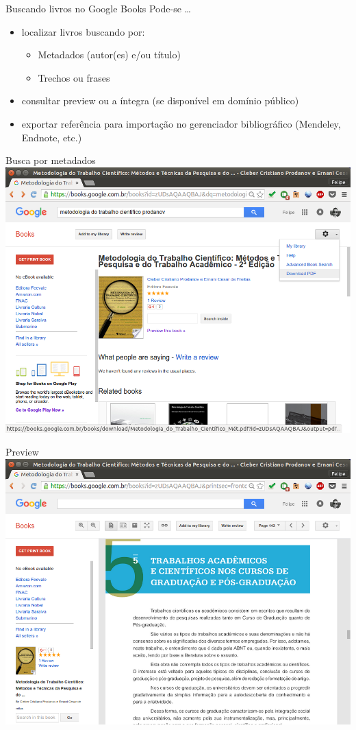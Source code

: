 \documentclass{beamer}
\begin{document}
\begin{frame}{Buscando livros no Google Books}
  Pode-se \ldots
  \begin{itemize}
  \item localizar livros buscando por:
    \begin{itemize}
    \item Metadados (autor(es) e/ou título)
    \item Trechos ou frases
    \end{itemize}
  \item consultar preview ou a íntegra (se disponível em domínio
    público)
  \item \alert{exportar} referência para \alert{importação} no
    gerenciador bibliográfico (Mendeley, Endnote, etc.)
  \end{itemize}
\end{frame}

\begin{frame}{Busca por metadados}
  \includegraphics[height=.85\textheight]{Busca/gbooks-livro}

\end{frame}

\begin{frame}{Preview}
  \includegraphics[height=.85\textheight]{Busca/gbooks-preview}
\end{frame}
\end{document}
